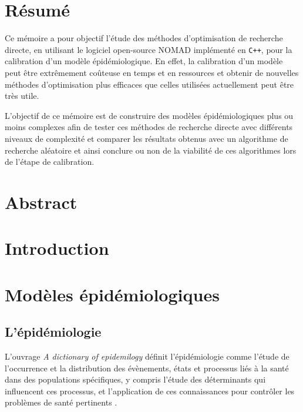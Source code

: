 \documentclass[french]{report}
\begin{document}
\newpage
\chapter*{Résumé}

Ce mémoire a pour objectif l'étude des méthodes d’optimisation de recherche directe, en utilisant le logiciel open-source NOMAD\cite{Nomad} implémenté en \verb!C++!, pour la calibration d’un modèle épidémiologique. En effet, la calibration d'un modèle peut être extrêmement coûteuse en temps et en ressources et obtenir de nouvelles méthodes d'optimisation plus efficaces que celles utilisées actuellement peut être très utile.

L'objectif de ce mémoire est de construire des modèles épidémiologiques plus ou moins complexes afin de tester ces méthodes de recherche directe avec différents niveaux de complexité et comparer les résultats obtenus avec un algorithme de recherche aléatoire et ainsi conclure ou non de la viabilité de ces algorithmes lors de l'étape de calibration.

\chapter*{Abstract}
\tableofcontents
\newpage

\chapter*{Introduction}

\chapter{Modèles épidémiologiques}

\section{L'épidémiologie}

L'ouvrage \textit{A dictionary of epidemilogy} \cite{ADictionaryofEpidemiology} définit l'épidémiologie comme \og l'étude de l’occurrence et la distribution des évènements, états et processus liés à la santé dans des populations spécifiques, y compris l'étude des déterminants qui influencent ces processus, et l'application de ces connaissances pour contrôler les problèmes de santé pertinents \fg.
\end{document}
